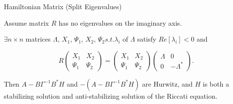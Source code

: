 
\begin{frame}{Hamiltonian Matrix (Split Eigenvalues)}

\begin{block}{}
Assume matrix $R$ has no eigenvalues on the imaginary axis. 
\end{block}

$\exists  n\times n$ matrices $\Lambda$, $X_{1}$, $\Psi_{1}$, $X_{2}$, $\Psi_{2}  s.t.  \lambda_{i}$ of $\Lambda$ satisfy $Re[\lambda_{i}]<0$ and 

\begin{equation*}
 R \left(\begin{array}{cc} X_{1} & X_{2} \\ \Psi_{1} & \Psi_{2} \end{array}\right) =
\left(\begin{array}{cc} X_{1} & X_{2} \\ \Psi_{1} & \Psi_{2} \end{array}\right)
\left(\begin{array}{cc} \Lambda & 0 \\ 0 & -\Lambda^{*} \end{array}\right).
\end{equation*}



Then $A-B\Gamma^{-1}B^{*}H$  and $-(A-B\Gamma^{-1}B^{*}H)$ are Hurwitz, and $H$ is both a stabilizing solution and anti-stabilizing solution of the Riccati equation. 




\end{frame}


